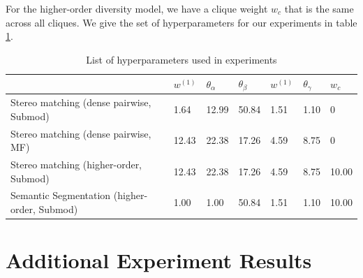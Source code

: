 {{{{For the higher-order diversity model, we have a clique weight $w_c$ that is the same across all cliques. We give the set of hyperparameters for our experiments in table \ref{tab:hyper}. 
 
\begin{table}[]
\begin{tabular}{|l|l|l|l|l|l|l|}
\hline
{} &  $w^{(1)}$ & $\theta_{\alpha}$ & $\theta_{\beta}$ &  $w^{(1)}$ & $\theta_{\gamma}$ & $w_c$\\
\hline
Stereo matching (dense pairwise, Submod) & 1.64 & 12.99 & 50.84 &  1.51 & 1.10 & 0  \\
\hline
Stereo matching (dense pairwise, MF) & 12.43 & 22.38 & 17.26 & 4.59 & 8.75 & 0  \\
\hline
Stereo matching (higher-order, Submod) & 12.43 & 22.38 & 17.26 & 4.59 & 8.75 & 10.00 \\
\hline
Semantic Segmentation (higher-order, Submod) & 1.00 & 1.00 & 50.84 & 1.51 & 1.10 & 10.00 \\
\hline
\end{tabular}
\caption{List of hyperparameters used in experiments}
\label{tab:hyper}
\end{table}

\iffalse
\section{Additional Experiment Results}

}}}}
